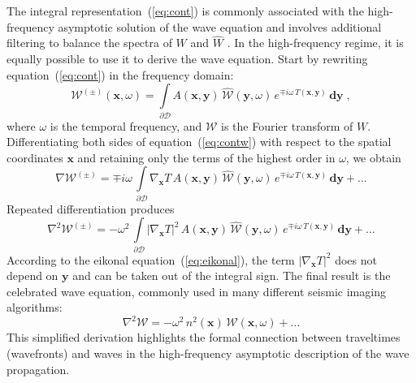 The integral representation~(\ref{eq:cont}) is commonly associated with the
high-frequency asymptotic solution of the wave equation and involves
additional filtering to balance the spectra of $W$ and $\widehat{W}$
\cite[]{norm}. In the high-frequency regime, it is equally possible to use it
to derive the wave equation. Start by rewriting equation~(\ref{eq:cont}) in
the frequency domain:
\begin{equation}
\label{eq:contw}
\mathcal{W}^{(\pm)}(\mathbf{x},\omega) = \int\limits_{\partial \mathcal{D}} 
A(\mathbf{x},\mathbf{y})\,
\widehat{\mathcal{W}}\left(\mathbf{y},\omega\right)\,
e^{\mp i \omega\,T(\mathbf{x},\mathbf{y})}\,
\mathbf{d y}\;,
\end{equation}
where $\omega$ is the temporal frequency, and $\mathcal{W}$ is the Fourier
transform of $W$. Differentiating both sides of equation~(\ref{eq:contw}) with
respect to the spatial coordinates $\mathbf{x}$ and retaining only the terms
of the highest order in $\omega$, we obtain
\begin{equation}
\label{eq:nabla}
\nabla \mathcal{W}^{(\pm)} = \mp i \omega\,
\int\limits_{\partial \mathcal{D}} 
\nabla_{\mathbf{x}} T\,A(\mathbf{x},\mathbf{y})\,
\widehat{\mathcal{W}}\left(\mathbf{y},\omega\right)\,
e^{\mp i \omega\,T(\mathbf{x},\mathbf{y})}\,
\mathbf{d y} + \ldots
\end{equation}
Repeated differentiation produces
\begin{equation}
\label{eq:nabla2}
\nabla^2 \mathcal{W}^{(\pm)} = - \omega^2\,
\int\limits_{\partial \mathcal{D}} 
\left|\nabla_{\mathbf{x}} T\right|^2\,A(\mathbf{x},\mathbf{y})\,
\widehat{\mathcal{W}}\left(\mathbf{y},\omega\right)\,
e^{\mp i \omega\,T(\mathbf{x},\mathbf{y})}\,
\mathbf{d y} + \ldots
\end{equation}
According to the eikonal equation~(\ref{eq:eikonal}), the term
$\left|\nabla_{\mathbf{x}} T\right|^2$ does not depend on $\mathbf{y}$ and can
be taken out of the integral sign. The final result is the celebrated wave
equation, commonly used in many different seismic imaging algorithms:
\begin{equation}
\label{eq:nabla}
\nabla^2 \mathcal{W} 
= - \omega^2\,n^2(\mathbf{x})\,\mathcal{W}(\mathbf{x},\omega) 
+ \ldots
\end{equation}
This simplified derivation highlights the formal connection between
traveltimes (wavefronts) and waves in the high-frequency asymptotic
description of the wave propagation.

